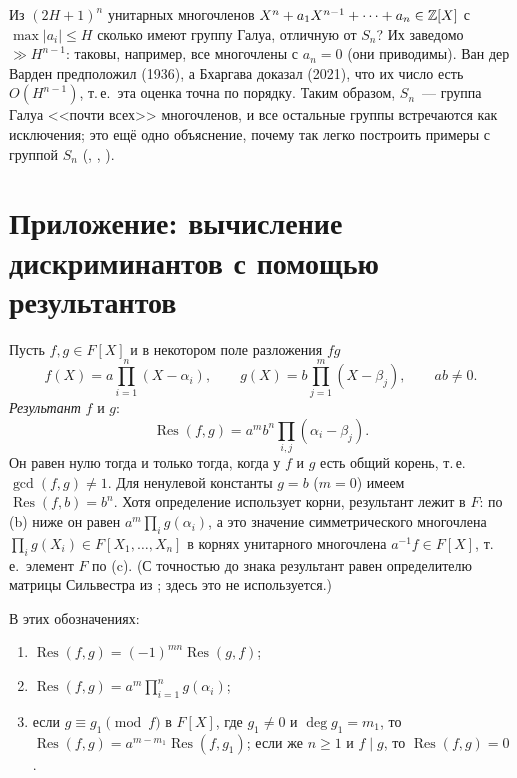 \begin{aside}[4.34]
Из $(2H+1)^n$ унитарных многочленов $X^n+a_1X^{n-1}+\dots+a_n\in\mathbb Z[X]$ с $\max|a_i|\le H$ сколько имеют группу Галуа, отличную
от $S_n$? Их заведомо $\gg H^{n-1}$: таковы, например, все многочлены с $a_n=0$ (они приводимы). Ван дер Варден
предположил (1936), а Бхаргава доказал (2021), что их число есть $O(H^{n-1})$, т.\,е.\ эта оценка точна по порядку. Таким
образом, $S_n$~--- группа Галуа <<почти всех>> многочленов, и все остальные группы встречаются как исключения; это ещё
одно объяснение, почему так легко построить примеры с группой $S_n$ (, , ).
\end{aside}

\section{Приложение: вычисление дискриминантов с помощью результантов}

Пусть $f,g\in F[X]$ и в некотором поле разложения $fg$
\[
f(X)=a\prod_{i=1}^n(X-\alpha_i),\qquad g(X)=b\prod_{j=1}^m(X-\beta_j),\qquad ab\ne0 .
\]
\emph{Результант} $f$ и $g$:
\[
\operatorname{Res}(f,g)=a^mb^n\prod_{i,j}(\alpha_i-\beta_j).
\]
Он равен нулю тогда и только тогда, когда у $f$ и $g$ есть общий корень, т.\,е.\ $\gcd(f,g)\ne1$. Для ненулевой константы
$g=b$ ($m=0$) имеем $\operatorname{Res}(f,b)=b^n$. Хотя определение использует корни, результант лежит в $F$: по (b)
ниже он равен $a^m\prod_ig(\alpha_i)$, а это значение симметрического многочлена $\prod_ig(X_i)\in F[X_1,\dots,X_n]$ в
корнях унитарного многочлена $a^{-1}f\in F[X]$, т.\,е.\ элемент $F$ по (c). (С точностью до знака результант равен
определителю матрицы Сильвестра из ; здесь это не используется.)

\begin{proposition}[4.35]
В этих обозначениях:
\begin{enumerate}[label=\textup{(\alph*)}]
\item $\operatorname{Res}(f,g)=(-1)^{mn}\operatorname{Res}(g,f)$;
\item $\operatorname{Res}(f,g)=a^m\prod_{i=1}^ng(\alpha_i)$;
\item если $g\equiv g_1\pmod f$ в $F[X]$, где $g_1\ne0$ и $\deg g_1=m_1$, то
$\operatorname{Res}(f,g)=a^{m-m_1}\operatorname{Res}(f,g_1)$; если же $n\ge1$ и $f\mid g$, то $\operatorname{Res}(f,g)=0$.
\end{enumerate}
\end{proposition}

